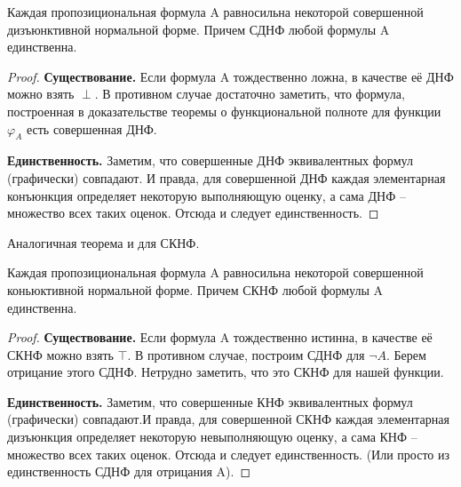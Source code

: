 \begin{theorem}
	Каждая пропозициональная формула A равносильна некоторой совершенной дизъюнктивной нормальной форме. Причем СДНФ
	любой формулы A единственна.
\end{theorem}

\begin{proof}
	\textbf{Существование.} Если формула A тождественно ложна, в качестве её ДНФ можно взять $\perp$. В противном
	случае достаточно заметить, что формула, построенная в доказательстве теоремы о функциональной полноте для
	функции $\varphi_{A}$ есть совершенная ДНФ.

	\textbf{Единственность.}
	Заметим, что совершенные ДНФ эквивалентных формул (графически) совпадают. И правда, для совершенной ДНФ каждая
	элементарная конъюнкция определяет некоторую выполняющую оценку, а сама ДНФ -- множество всех таких оценок.
	Отсюда и следует единственность.
\end{proof}
{Аналогичная теорема и для СКНФ.}
\begin{theorem}
	Каждая пропозициональная формула A равносильна некоторой совершенной коньюктивной нормальной форме. Причем СКНФ
	любой формулы A единственна.
\end{theorem}

\begin{proof}
	\textbf{Существование.} Если формула A тождественно истинна, в качестве её СКНФ можно взять $\top$. В противном
	случае, построим СДНФ для $\neg A$. Берем отрицание этого СДНФ. Нетрудно заметить, что это СКНФ для нашей
	функции.  

	\textbf{Единственность.}
	Заметим, что совершенные КНФ эквивалентных формул (графически) совпадают.И правда, для совершенной СКНФ каждая
	элементарная дизъюнкция определяет некоторую невыполняющую оценку, а сама КНФ -- множество всех таких оценок.
	Отсюда и следует единственность. (Или просто из единственность СДНФ для отрицания A).
\end{proof}
